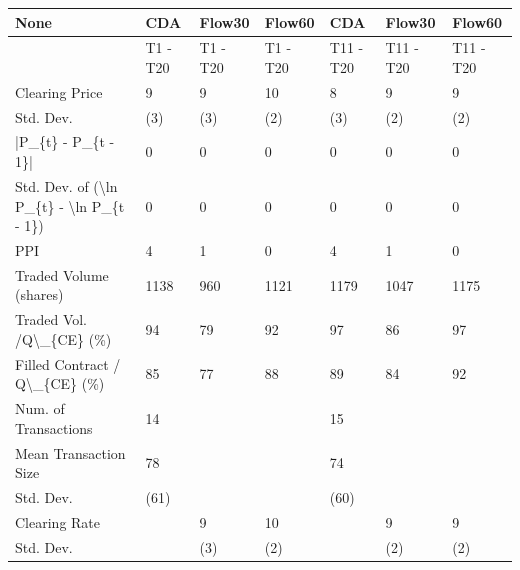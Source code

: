 \begin{tabular}{lllllll}
\hline
 None                                                      & CDA      & Flow30   & Flow60   & CDA       & Flow30    & Flow60    \\
\hline
                                                           & T1 - T20 & T1 - T20 & T1 - T20 & T11 - T20 & T11 - T20 & T11 - T20 \\
 Clearing Price                                            & 9        & 9        & 10       & 8         & 9         & 9         \\
 Std. Dev.                                                 & (3)      & (3)      & (2)      & (3)       & (2)       & (2)       \\
 |P\_\{t\} - P\_\{t - 1\}|                                       & 0        & 0        & 0        & 0         & 0         & 0         \\
 Std. Dev. of (\textbackslash{}ln P\_\{t\} - \textbackslash{}ln P\_\{t - 1\})                  & 0        & 0        & 0        & 0         & 0         & 0         \\
 PPI                                                       & 4        & 1        & 0        & 4         & 1         & 0         \\
 Traded Volume (shares)                                    & 1138     & 960      & 1121     & 1179      & 1047      & 1175      \\
 Traded Vol. /Q\textbackslash{}\_\{CE\} (\%)                                  & 94       & 79       & 92       & 97        & 86        & 97        \\
 Filled Contract / Q\textbackslash{}\_\{CE\} (\%)                             & 85       & 77       & 88       & 89        & 84        & 92        \\
 Num. of Transactions                                      & 14       &          &          & 15        &           &           \\
 Mean Transaction Size                                     & 78       &          &          & 74        &           &           \\
 Std. Dev.                                                 & (61)     &          &          & (60)      &           &           \\
 Clearing Rate                                             &          & 9        & 10       &           & 9         & 9         \\
 Std. Dev.                                                 &          & (3)      & (2)      &           & (2)       & (2)       \\

\end{tabular}
